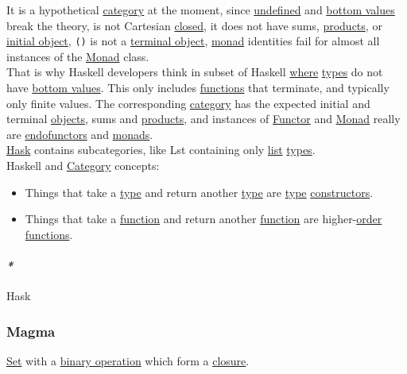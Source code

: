 \documentclass[11pt]{article}
\begin{document}
It is a hypothetical \hyperref[org0450535]{category} at the moment, since \hyperref[orgabd0f15]{undefined} and \hyperref[org46550b8]{bottom values} break the theory, is not Cartesian \hyperref[orgcdd7006]{closed}, it does not have sums, \hyperref[orgacb3cee]{products}, or \hyperref[org775e1a6]{initial object}, \texttt{()} is not a \hyperref[org84bb7e1]{terminal object}, \hyperref[org86a5d95]{monad} identities fail for almost all instances of the \hyperref[org86a5d95]{Monad} class.\\

That is why Haskell developers think in subset of Haskell \hyperref[org3e5903d]{where} \hyperref[org4209edd]{types} do not have \hyperref[org46550b8]{bottom values}. This only includes \hyperref[orgaa8fb87]{functions} that terminate, and typically only finite values. The corresponding \hyperref[org0450535]{category} has the expected initial and terminal \hyperref[org363acc2]{objects}, sums and \hyperref[orgacb3cee]{products}, and instances of \hyperref[orgf2f6841]{Functor} and \hyperref[org86a5d95]{Monad} really are \hyperref[orgfcca64a]{endofunctors} and \hyperref[org0d4a4ef]{monads}.\\

\hyperref[org02813f7]{Hask} contains subcategories, like Lst containing only \hyperref[org874a6e0]{list} \hyperref[org4209edd]{types}.\\

Haskell and \hyperref[org0450535]{Category} concepts:\\
\begin{itemize}
\item Things that take a \hyperref[orgc4aea2f]{type} and return another \hyperref[orgc4aea2f]{type} are \hyperref[orgc4aea2f]{type} \hyperref[org7a9d75a]{constructors}.\\
\item Things that take a \hyperref[orge15bc14]{function} and return another \hyperref[orge15bc14]{function} are higher-\hyperref[orgc0a359b]{order} \hyperref[orgaa8fb87]{functions}.\\
\end{itemize}

\paragraph{\emph{*}}
\label{sec:org8fcfabb}

\label{org02813f7}Hask\\

\subsubsection{\label{org05fa596}Magma}
\label{sec:orga7e3c76}
\hyperref[org1faf06d]{Set} with a \hyperref[orga030476]{binary operation} which form a \hyperref[org89569e8]{closure}.\\
\end{document}
